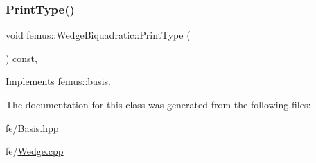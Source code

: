 \mbox{\label{classfemus_1_1_wedge_biquadratic_a7152bbe7398026b63f46d67d7c947f89}} 
\subsubsection{\texorpdfstring{Print\+Type()}{PrintType()}}
{\footnotesize\ttfamily void femus\+::\+Wedge\+Biquadratic\+::\+Print\+Type (\begin{DoxyParamCaption}{ }\end{DoxyParamCaption}) const\hspace{0.3cm}{\ttfamily [inline]}, {\ttfamily [virtual]}}



Implements \mbox{\hyperlink{classfemus_1_1basis_abbae7bf8f31ec5793c911bc6d4ea0572}{femus\+::basis}}.



The documentation for this class was generated from the following files\+:\begin{DoxyCompactItemize}
\item 
fe/\mbox{\hyperlink{_basis_8hpp}{Basis.\+hpp}}\item 
fe/\mbox{\hyperlink{_wedge_8cpp}{Wedge.\+cpp}}\end{DoxyCompactItemize}
